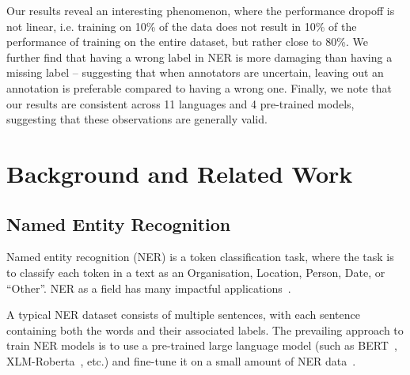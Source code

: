\documentclass{article}
\newcommand{\mike}[1]{\textcolor{red}{#1}}
\begin{document}
Our results reveal an interesting  phenomenon, where the performance dropoff is not linear, i.e. training on 10\% of the data does not result in 10\% of the performance of training on the entire dataset, but rather close to 80\%. We further find that having a wrong label in NER is more damaging than having a missing label -- suggesting that when annotators are uncertain, leaving out an annotation is preferable compared to having a wrong one. Finally, we note that our results are consistent across 11 languages and 4 pre-trained models, suggesting that these observations are generally valid.


\section{Background and Related Work}
\subsection{Named Entity Recognition}
Named entity recognition (NER) is a token classification task, where the task is to classify each token in a text as an Organisation, Location, Person, Date, or ``Other''. NER as a field has many impactful applications~\citep{sang2003introduction_conll,lample2016Playing}.

A typical NER dataset consists of multiple sentences, with each sentence containing both the words and their associated labels.
The prevailing approach to train NER models is to use a pre-trained large language model (such as BERT~\citep{devlin2019BERT}, XLM-Roberta~\citep{conneau2019Unsupervised}, etc.) and fine-tune it on a small amount of NER data~\citep{conneau2019Unsupervised,adelani2021MasakhaNER}.

\end{document}
